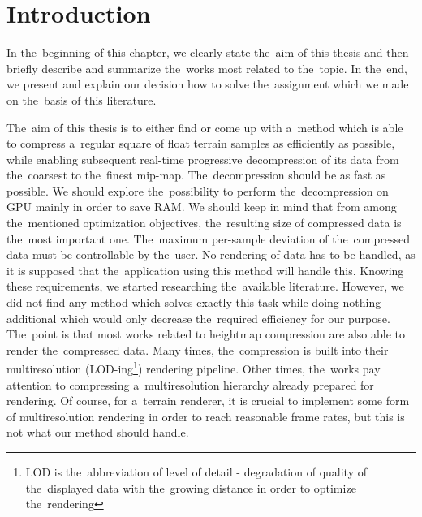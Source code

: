 \chapter{Introduction}\label{chap:introduction}

In the~beginning of this chapter, we clearly state the~aim of this thesis and then briefly describe and summarize the~works most related to the~topic. In the~end, we present and explain our decision how to solve the~assignment which we made on the~basis of this literature.

The~aim of this thesis is to either find or come up with a~method which is able to compress a~regular square of float terrain samples as efficiently as possible, while enabling subsequent real-time progressive decompression of its data from the~coarsest to the~finest mip-map. The~decompression should be as fast as possible. We should explore the~possibility to perform the~decompression on GPU mainly in order to save RAM. We should keep in mind that from among the~mentioned optimization objectives, the~resulting size of compressed data is the~most important one. The~maximum per-sample deviation of the~compressed data must be controllable by the~user. No rendering of data has to be handled, as it is supposed that the~application using this method will handle this. Knowing these requirements, we started researching the~available literature. However, we did not find any method which solves exactly this task while doing nothing additional which would only decrease the~required efficiency for our purpose. The~point is that most works related to heightmap compression are also able to render the~compressed data. Many times, the~compression is built into their multiresolution (LOD-ing\footnote{LOD is the~abbreviation of level of detail - degradation of quality of the~displayed data with the~growing distance in order to optimize the~rendering}) rendering pipeline. Other times, the~works pay attention to compressing a~multiresolution hierarchy already prepared for rendering. Of course, for a~terrain renderer, it is crucial to implement some form of multiresolution rendering in order to reach reasonable frame rates, but this is not what our method should handle. 

